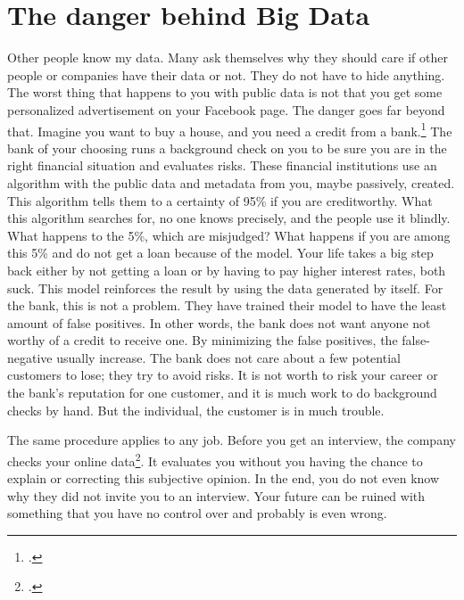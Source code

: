 \documentclass[paper=a4, fontsize=11pt]{article}
\begin{document}
\section{The danger behind Big Data}
Other people know my data. Many ask themselves why they should care if other people or companies have their data or not. They do not have to hide anything.
The worst thing that happens to you with public data is not that you get some personalized advertisement on your Facebook page. The danger goes far beyond that. Imagine you want to buy a house, and you need a credit from a bank.\footcite{bankscheck} The bank of your choosing runs a background check on you to be sure you are in the right financial situation and evaluates risks. These financial institutions use an algorithm with the public data and metadata from you, maybe passively, created. This algorithm tells them to a certainty of 95\% if you are creditworthy. What this algorithm searches for, no one knows precisely, and the people use it blindly. What happens to the 5\%, which are misjudged? What happens if you are among this 5\% and do not get a loan because of the model. Your life takes a big step back either by not getting a loan or by having to pay higher interest rates, both suck. This model reinforces the result by using the data generated by itself. For the bank, this is not a problem. They have trained their model to have the least amount of false positives. In other words, the bank does not want anyone not worthy of a credit to receive one. By minimizing the false positives, the false-negative usually increase. The bank does not care about a few potential customers to lose; they try to avoid risks. It is not worth to risk your career or the bank's reputation for one customer, and it is much work to do background checks by hand. But the individual, the customer is in much trouble.

The same procedure applies to any job. Before you get an interview, the company checks your online data\footcite{background}. It evaluates you without you having the chance to explain or correcting this subjective opinion. In the end, you do not even know why they did not invite you to an interview. Your future can be ruined with something that you have no control over and probably is even wrong.
\end{document}
